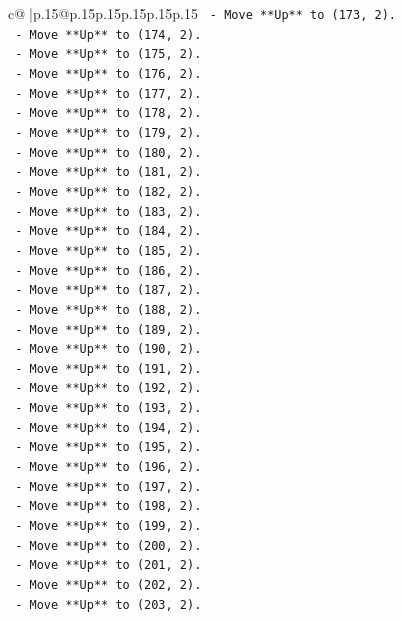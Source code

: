 \documentclass{article}
\begin{document}
{\begin{supertabular}{c@{$\;$}|p{.15\linewidth}@{}p{.15\linewidth}p{.15\linewidth}p{.15\linewidth}p{.15\linewidth}p{.15\linewidth}}
{{{\texttt{    {-} Move **Up** to (173, 2).} \\
\texttt{    {-} Move **Up** to (174, 2).} \\
\texttt{    {-} Move **Up** to (175, 2).} \\
\texttt{    {-} Move **Up** to (176, 2).} \\
\texttt{    {-} Move **Up** to (177, 2).} \\
\texttt{    {-} Move **Up** to (178, 2).} \\
\texttt{    {-} Move **Up** to (179, 2).} \\
\texttt{    {-} Move **Up** to (180, 2).} \\
\texttt{    {-} Move **Up** to (181, 2).} \\
\texttt{    {-} Move **Up** to (182, 2).} \\
\texttt{    {-} Move **Up** to (183, 2).} \\
\texttt{    {-} Move **Up** to (184, 2).} \\
\texttt{    {-} Move **Up** to (185, 2).} \\
\texttt{    {-} Move **Up** to (186, 2).} \\
\texttt{    {-} Move **Up** to (187, 2).} \\
\texttt{    {-} Move **Up** to (188, 2).} \\
\texttt{    {-} Move **Up** to (189, 2).} \\
\texttt{    {-} Move **Up** to (190, 2).} \\
\texttt{    {-} Move **Up** to (191, 2).} \\
\texttt{    {-} Move **Up** to (192, 2).} \\
\texttt{    {-} Move **Up** to (193, 2).} \\
\texttt{    {-} Move **Up** to (194, 2).} \\
\texttt{    {-} Move **Up** to (195, 2).} \\
\texttt{    {-} Move **Up** to (196, 2).} \\
\texttt{    {-} Move **Up** to (197, 2).} \\
\texttt{    {-} Move **Up** to (198, 2).} \\
\texttt{    {-} Move **Up** to (199, 2).} \\
\texttt{    {-} Move **Up** to (200, 2).} \\
\texttt{    {-} Move **Up** to (201, 2).} \\
\texttt{    {-} Move **Up** to (202, 2).} \\
\texttt{    {-} Move **Up** to (203, 2).} \\
}}}
\end{supertabular}}
\end{document}

